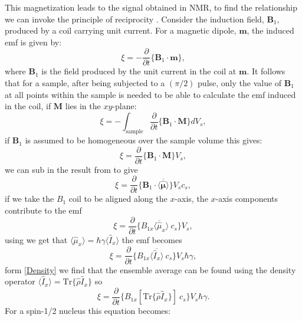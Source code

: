 This magnetization leads to the signal obtained in NMR, to find the relationship we can
invoke the principle of reciprocity \citep{Hoult:1976dw}. Consider the induction
field, $\mathbf{B}_1$, produced by a coil carrying unit current. For a magnetic dipole, $\mathbf{m}$,
the induced emf is given by:
\begin{equation}
  \xi = -\frac{\partial}{\partial{t}}\{\mathbf{B}_1\cdot\mathbf{m}\},
\end{equation}
where $\mathbf{B}_1$ is the field produced by the unit current in the coil at $\mathbf{m}$. It follows
that for a sample, after being subjected to a $(\pi/2)$ pulse, only the value of
$\mathbf{B}_1$ at all points within the sample is needed to be able to calculate the emf induced
in the coil, if $\mathbf{M}$ lies in the $xy$-plane:
\begin{equation}
  \xi = -\int_{\text{sample}} \frac{\partial}{\partial{t}}\{\mathbf{B}_1\cdot\mathbf{M}\} dV_s,
\end{equation}
if $\mathbf{B}_1$ is assumed to be homogeneous over the sample volume this gives:
\begin{equation}
  \xi = \frac{\partial}{\partial{t}}\{\mathbf{B}_1\cdot\mathbf{M}\}V_s,
\end{equation}
we can sub in the result from  to give
\begin{equation}
  \xi = \frac{\partial}{\partial{t}}\{\mathbf{B}_1\cdot\langle\overbar{\hat{\pmb{\mu}}}\rangle\}V_sc_s,
\end{equation}
if we take the $B_1$ coil to be aligned along the $x$-axis, the $x$-axis components contribute to the emf
\begin{equation}
  \xi = \frac{\partial}{\partial{t}}\{B_{1x}\langle\overbar{\hat{\mu}}_x\rangle~c_s\}V_s,
\end{equation}
using  we get that $\langle\hat{\mu}_x\rangle = \hbar\gamma\langle{\hat{I}_x}\rangle$
the emf becomes
\begin{equation}
  \xi = \frac{\partial}{\partial{t}}\{B_{1x}\langle\overbar{\hat{I}_x}\rangle~c_s\}V_s\hbar\gamma,
\end{equation}
form \ref{Density} we find that the ensemble average can be found using the density operator
$\langle{\hat{I}_x}\rangle = \text{Tr}\{\hat{\rho}\hat{I}_x\}$ so
\begin{equation}
  \xi = \frac{\partial}{\partial{t}}\{B_{1x}[\text{Tr}\{\hat{\rho}\hat{I}_x\}]~c_s\}V_s\hbar\gamma.
\end{equation}
For a spin-1/2 nucleus this equation becomes:
